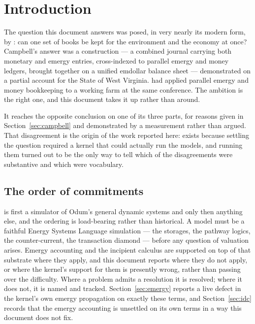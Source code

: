 \documentclass[11pt,a4paper]{article}
\begin{document}
\tableofcontents

\section{Introduction}
\label{sec:intro}

The question this document answers was posed, in very nearly its modern form, by \citet{campbell_Keeping_2013}: can one set of books be kept for the environment and the economy at once? Campbell's answer was a construction --- a combined journal carrying both monetary and emergy entries, cross-indexed to parallel emergy and money ledgers, brought together on a unified emdollar balance sheet --- demonstrated on a partial account for the State of West Virginia. \citet{ortega2005} had applied parallel emergy and money bookkeeping to a working farm at the same conference. The ambition is the right one, and this document takes it up rather than around.

It reaches the opposite conclusion on one of its three parts, for reasons given in Section~\ref{sec:campbell} and demonstrated by a measurement rather than argued. That disagreement is the origin of the work reported here: \gssk{} exists because settling the question required a kernel that could actually run the models, and running them turned out to be the only way to tell which of the disagreements were substantive and which were vocabulary.

\subsection*{The order of commitments}

\gssk{} is first a simulator of Odum's general dynamic systems and only then anything else, and the ordering is load-bearing rather than historical. A model must be a faithful Energy Systems Language simulation --- the storages, the pathway logics, the counter-current, the transaction diamond --- before any question of valuation arises. Emergy accounting and the incipient calculus are supported on top of that substrate where they apply, and this document reports where they do not apply, or where the kernel's support for them is presently wrong, rather than passing over the difficulty. Where a problem admits a resolution it is resolved; where it does not, it is named and tracked. Section~\ref{sec:emergy} reports a live defect in the kernel's own emergy propagation on exactly these terms, and Section~\ref{sec:idc} records that the emergy accounting is unsettled on its own terms in a way this document does not fix.
\end{document}
